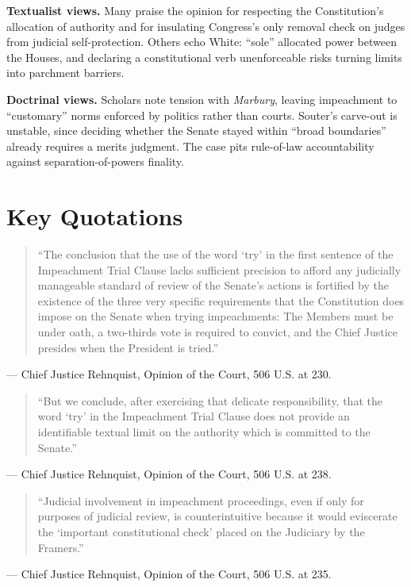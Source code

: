 \documentclass[12pt]{article}
\begin{document}
\textbf{Textualist views.} Many praise the opinion for respecting the Constitution's allocation of authority and for insulating Congress's only removal check on judges from judicial self-protection. Others echo White: ``sole'' allocated power between the Houses, and declaring a constitutional verb unenforceable risks turning limits into parchment barriers.

\textbf{Doctrinal views.} Scholars note tension with \textit{Marbury}, leaving impeachment to ``customary'' norms enforced by politics rather than courts. Souter's carve-out is unstable, since deciding whether the Senate stayed within ``broad boundaries'' already requires a merits judgment. The case pits rule-of-law accountability against separation-of-powers finality.

\section{Key Quotations}

\begin{quote}
``The conclusion that the use of the word `try' in the first sentence of the Impeachment Trial Clause lacks sufficient precision to afford any judicially manageable standard of review of the Senate's actions is fortified by the existence of the three very specific requirements that the Constitution does impose on the Senate when trying impeachments: The Members must be under oath, a two-thirds vote is required to convict, and the Chief Justice presides when the President is tried.''
\end{quote}
\noindent --- Chief Justice Rehnquist, Opinion of the Court, 506 U.S. at 230.

\begin{quote}
``But we conclude, after exercising that delicate responsibility, that the word `try' in the Impeachment Trial Clause does not provide an identifiable textual limit on the authority which is committed to the Senate.''
\end{quote}
\noindent --- Chief Justice Rehnquist, Opinion of the Court, 506 U.S. at 238.

\begin{quote}
``Judicial involvement in impeachment proceedings, even if only for purposes of judicial review, is counterintuitive because it would eviscerate the `important constitutional check' placed on the Judiciary by the Framers.''
\end{quote}
\noindent --- Chief Justice Rehnquist, Opinion of the Court, 506 U.S. at 235.
\end{document}
